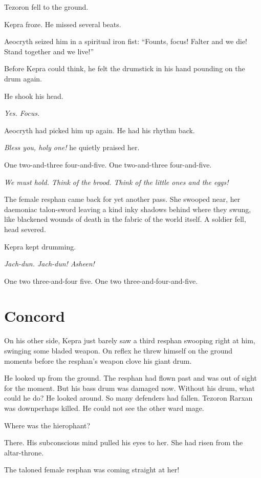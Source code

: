 \documentclass
  [a4paper,
   12pt,
   oneside
  ]%
  {article}
\newcommand{\drum}[1]{\textsf{#1}}
\begin{document}
Tezoron fell to the ground. 

Kepra froze. He missed several beats. 

Aeocryth seized him in a spiritual iron fist: 
``Founts, focus! Falter and we die! Stand together and we live!'' 

Before Kepra could think, he felt the drumstick in his hand pounding on the drum again. 

He shook his head. 

\emph{Yes. Focus.} 

Aeocryth had picked him up again. He had his rhythm back. 

\emph{Bless you, holy one!} he quietly praised her.

\drum{One two-and-three four-and-five. One two-and-three four-and-five.}

\emph{We must hold. Think of the brood. Think of the little ones and the eggs!}

The female resphan came back for yet another pass. She swooped near, her daemoniac talon-sword leaving a kind inky shadows behind where they swung, like blackened wounds of death in the fabric of the world itself. 
A soldier fell, head severed. 

Kepra kept drumming. 

\emph{Jach-dun. Jach-dun! Asheen!}

\drum{One two three-and-four five. One two three-and-four-and-five.}



\section{Concord}
On his other side, Kepra just barely saw a third resphan swooping right at him, swinging some bladed weapon. On reflex he threw himself on the ground moments before the resphan's weapon clove his giant drum. 

He looked up from the ground. 
The resphan had flown past and was out of sight for the moment. 
But his bass drum was damaged now.
Without his drum, what could he do? 
He looked around. So many defenders had fallen. Tezoron Rarxan was down\dash{}perhaps killed. He could not see the other ward mage. 

Where was the hierophant? 

There.
His subconscious mind pulled his eyes to her. She had risen from the altar-throne.

The taloned female resphan was coming straight at her! 
\end{document}
